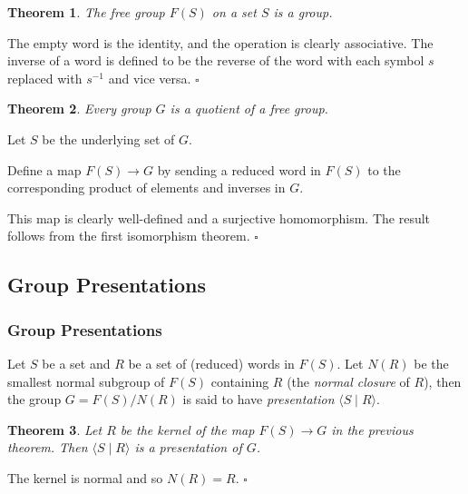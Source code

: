 \documentclass[10pt]{article}
\newtheorem{theorem}{Theorem}[section]
\newenvironment{proof}[1][Proof]{\begin{trivlist}
\item[\hskip \labelsep {\itshape #1}]}{\end{trivlist}}
\newenvironment{definition}[1][Definition]{\begin{trivlist}
\item[\hskip \labelsep {\bfseries #1}]}{\end{trivlist}}
\begin{document}
\begin{theorem}
The free group $F(S)$ on a set $S$ is a group.
\end{theorem}

\begin{proof}
The empty word is the identity, and the operation is clearly associative. The inverse of a word is defined to be the reverse of the word with each symbol $s$ replaced with $s^{-1}$ and vice versa. $\square$
\end{proof}

\begin{theorem}
Every group $G$ is a quotient of a free group.
\end{theorem}

\begin{proof}
Let $S$ be the underlying set of $G$.

Define a map $F(S) \to G$ by sending a reduced word in $F(S)$ to the corresponding product of elements and inverses in $G$.

This map is clearly well-defined and a surjective homomorphism. The result follows from the first isomorphism theorem. $\square$
\end{proof}

\subsection{Group Presentations}

\subsubsection{Group Presentations}

\begin{definition}
Let $S$ be a set and $R$ be a set of (reduced) words in $F(S)$. Let $N(R)$ be the smallest normal subgroup of $F(S)$ containing $R$ (the \emph{normal closure} of $R$), then the group $G = F(S)/N(R)$ is said to have \emph{presentation} $\langle S \;|\; R \rangle$.
\end{definition}

\begin{theorem}
Let $R$ be the kernel of the map $F(S) \to G$ in the previous theorem. Then $\langle S \;|\; R \rangle$ is a presentation of $G$.
\end{theorem}

\begin{proof}
The kernel is normal and so $N(R) = R$. $\square$
\end{proof}
\end{document}
